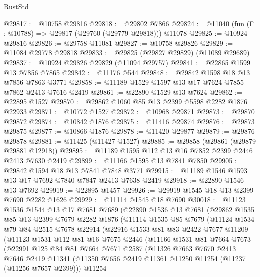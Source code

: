 \begin{lexlean}{RustStd}
\begin{coremodule}
@29817 := @10758 @29816
@29818 := @29802 @7866
@29824 := @11040 (fun (Γ : @10788) => @29817 (@29760 (@29779 @29818))) @11078
@29825 := @10924 @29816
@29826 := @29758 @11081
@29827 := @10758 @29826
@29829 := @11084 @29778 @29818
@29833 := @29825 (@29827 @29829) (@11089 @29689)
@29837 := @10924 @29826 @29829 (@11094 @29757)
@29841 := @22865 @1599 @13 @7856 @7865
@29842 := @11176 @544
@29848 := @29842 @1598 @18 @13 @7856 @7863 @3771
@29858 := @11189 @1529 @1597 @13 @17 @7624 @7855 @7862 @2413 @7616 @2419
@29861 := @22890 @1529 @13 @7624
@29862 := @22895 @1527
@29870 := @29862 @1060 @85 @13 @2399 @5598 @2282 @1876 @22933
@29871 := @10772 @1527
@29872 := @10968 @29871
@29873 := @29870 @29872
@29874 := @10842 @1876
@29875 := @11416 @29874
@29876 := @29873 @29875
@29877 := @10866 @1876
@29878 := @11420 @29877
@29879 := @29876 @29878
@29881 := @11425 (@11427 @1527)
@29885 := @29858 (@29861 (@29879 @29881 @12918))
@29895 := @11189 @1595 @112 @13 @16 @7852 @2399 @2446 @2413 @7630 @2419
@29899 := @11166 @1595 @13 @7841 @7850
@29905 := @29842 @1594 @18 @13 @7841 @7848 @3771
@29915 := @11189 @1546 @1593 @13 @17 @7692 @7840 @7847 @2413 @7638 @2419
@29918 := @22890 @1546 @13 @7692
@29919 := @22895 @1457
@29926 := @29919 @1545 @18 @13 @2399 @7690 @2282 @1626
@29929 := @11114 @1545 @18 @7690
@30018 := @11123
    @1536
    @1544
    @13
    @17
    @7681
    @7689
    (@22890
      @1536
      @13
      @7681
      (@29862
        @1535
        @85
        @13
        @2399
        @7679
        @2282
        @1876
        (@11114
          @1535
          @85
          @7679
          (@11124
            @1534
            @79
            @84
            @2515
            @7678
            @22914
            (@22916
              @1533
              @81
              @83
              @2422
              @7677
              @11209
              (@11123
                @1531
                @112
                @81
                @16
                @7675
                @2446
                (@11166
                  @1531
                  @81
                  @7664
                  @7673
                  (@22991
                    @125
                    @84
                    @81
                    @7664
                    @7671
                    @2587
                    (@11326
                      @7663
                      @7670
                      @2413
                      @7646
                      @2419
                      @11341
                      (@11350 @7656 @2419 @11361 @11250 @11254 (@11237 (@11256 @7657 @2399)))
                      @11254

\end{coremodule}
\end{lexlean}
